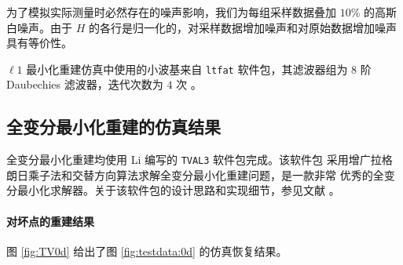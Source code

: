 为了模拟实际测量时必然存在的噪声影响，我们为每组采样数据叠加 $10\%$ 的高斯
白噪声。由于 $H$ 的各行是归一化的，对采样数据增加噪声和对原始数据增加噪声
具有等价性。

$\ell1$ 最小化重建仿真中使用的小波基来自 \verb|ltfat| 软件包，其滤波器组为
$8$ 阶 Daubechies 滤波器，迭代次数为 $4$ 次\cite{ltfatnote015} 
\cite{ltfatnote030} 。

\subsection{全变分最小化重建的仿真结果}

全变分最小化重建均使用 Li 编写的 \verb|TVAL3| 软件包完成。该软件包
采用增广拉格朗日乘子法和交替方向算法求解全变分最小化重建问题，是一款非常
优秀的全变分最小化求解器。关于该软件包的设计思路和实现细节，参见文献
\cite{TVAL3CBLMaster} \cite{TVAL3CBLPhD}。

\paragraph{对坏点的重建结果} 图 \ref{fig:TV0d} 给出了图 
\ref{fig:testdata:0d} 的仿真恢复结果。

